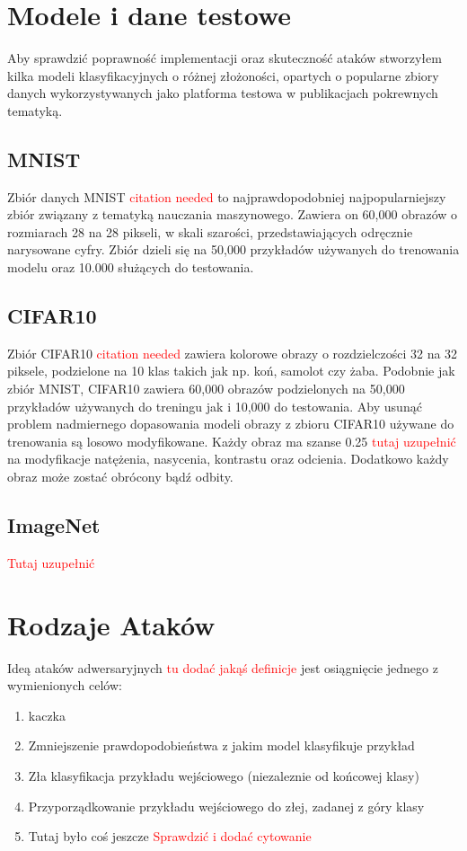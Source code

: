 \documentclass{article}
\newcommand\todo[1]{\textcolor{red}{#1}}
\begin{document}
\section{Modele i dane testowe}
Aby sprawdzić poprawność implementacji oraz skuteczność ataków stworzyłem
kilka modeli klasyfikacyjnych o różnej złożoności, opartych o popularne zbiory danych
wykorzystywanych jako platforma testowa w publikacjach pokrewnych tematyką.

    \subsection{MNIST}
    Zbiór danych MNIST \todo{citation needed} to najprawdopodobniej najpopularniejszy zbiór związany z
    tematyką nauczania maszynowego.
    Zawiera on 60,000 obrazów o rozmiarach 28 na 28 pikseli, w skali szarości, przedstawiających
    odręcznie narysowane cyfry. Zbiór dzieli się na 50,000 przykładów używanych do
    trenowania modelu oraz 10.000 służących do testowania.

    \subsection{CIFAR10}
    Zbiór CIFAR10 \todo{citation needed} zawiera kolorowe obrazy o rozdzielczości 32 na 32 piksele,
    podzielone na 10 klas takich jak np. koń, samolot czy żaba. Podobnie jak zbiór MNIST, CIFAR10 zawiera
    60,000 obrazów podzielonych na 50,000 przykładów używanych do treningu jak i 10,000 do testowania.
    Aby usunąć problem nadmiernego dopasowania modeli obrazy z zbioru CIFAR10 używane
    do trenowania są losowo modyfikowane. Każdy obraz ma szanse 0.25 \todo{tutaj uzupełnić} na
    modyfikacje natężenia, nasycenia, kontrastu oraz odcienia. Dodatkowo każdy obraz może zostać obrócony bądź odbity.

    \subsection{ImageNet}
    \todo{Tutaj uzupełnić}




\section{Rodzaje Ataków}
Ideą ataków adwersaryjnych \todo{tu dodać jakąś definicje} jest osiągnięcie jednego z wymienionych celów:
\begin{enumerate}
    \item kaczka
    \item Zmniejszenie prawdopodobieństwa z jakim model klasyfikuje przykład
    \item Zła klasyfikacja przykładu wejściowego (niezaleznie od końcowej klasy)
    \item Przyporządkowanie przykładu wejściowego do złej, zadanej z góry klasy
    \item Tutaj było coś jeszcze \todo{Sprawdzić i dodać cytowanie}
\end{enumerate}
\end{document}
